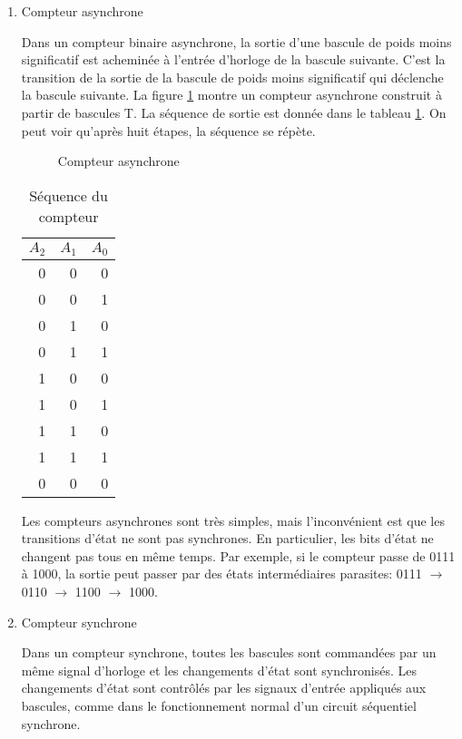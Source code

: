\documentclass[letter, oneside]{book}
\begin{document}
\begin{enumerate}
\item Compteur asynchrone
\label{sec:org9ffbd70}

Dans un compteur binaire asynchrone, la sortie d'une bascule de poids
moins significatif est acheminée à l'entrée d'horloge de la bascule
suivante. C'est la transition de la sortie de la bascule de poids
moins significatif qui déclenche la bascule suivante. La figure
\ref{fig:org87544dd} montre un compteur asynchrone construit à partir de
bascules T. La séquence de sortie est donnée dans le tableau
\ref{tab:org27a3d96}. On peut voir qu'après huit étapes, la séquence se
répète.

\begin{figure}[htbp]
\centering

\caption{\label{fig:org87544dd}Compteur asynchrone}
\end{figure}

\begin{table}[htbp]
\caption{\label{tab:org27a3d96}Séquence du compteur}
\centering
\begin{tabular}{rrr}
\(A_2\) & \(A_1\) & \(A_0\)\\[0pt]
\hline
0 & 0 & 0\\[0pt]
0 & 0 & 1\\[0pt]
0 & 1 & 0\\[0pt]
0 & 1 & 1\\[0pt]
1 & 0 & 0\\[0pt]
1 & 0 & 1\\[0pt]
1 & 1 & 0\\[0pt]
1 & 1 & 1\\[0pt]
0 & 0 & 0\\[0pt]
\end{tabular}
\end{table}

Les compteurs asynchrones sont très simples, mais l'inconvénient est
que les transitions d'état ne sont pas synchrones. En particulier,
les bits d'état ne changent pas tous en même temps. Par exemple, si le
compteur passe de 0111 à 1000, la sortie peut passer par des états
intermédiaires parasites: 0111 \(\rightarrow\) 0110 \(\rightarrow\) 1100
\(\rightarrow\) 1000.

\item Compteur synchrone
\label{sec:org7d9b12c}

Dans un compteur synchrone, toutes les bascules sont commandées par un
même signal d'horloge et les changements d'état sont
synchronisés. Les changements d'état sont contrôlés par les signaux
d'entrée appliqués aux bascules, comme dans le fonctionnement normal
d'un circuit séquentiel synchrone.


\end{enumerate}
\end{document}
